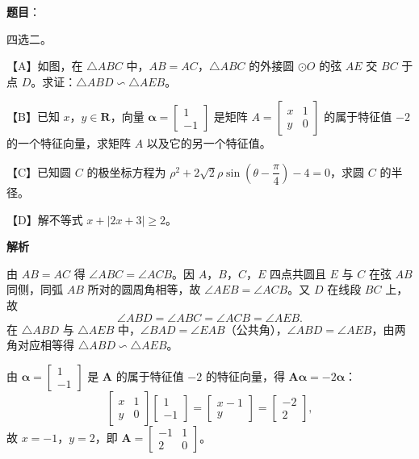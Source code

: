 \begin{answer}

\textbf{题目}：

四选二。

【A】如图，在 \(\triangle ABC\) 中，\(AB=AC\)，\(\triangle ABC\) 的外接圆 \(\odot O\) 的弦 \(AE\) 交 \(BC\) 于点 \(D\)。求证：\(\triangle ABD\backsim\triangle AEB\)。
\nopagebreak[4]
\begin{center}\end{center}
\nopagebreak[4]
【B】已知 \(x\)，\(y\in\mathbf{R}\)，向量 \(\boldsymbol\alpha=\begin{bmatrix}1\\-1\end{bmatrix}\) 是矩阵 $A=\begin{bmatrix}x&1\\y&0\end{bmatrix}$ 的属于特征值 \(-2\) 的一个特征向量，求矩阵 \(A\) 以及它的另一个特征值。

【C】已知圆 \(C\) 的极坐标方程为 \(\rho^{2}+2\sqrt{2}\rho\sin\left(\theta-\dfrac{\pi}{4}\right)-4=0\)，求圆 \(C\) 的半径。

【D】解不等式 \(x+|2x+3|\geqslant 2\)。

\textbf{解析}


由 \(AB=AC\) 得 \(\angle ABC=\angle ACB\)。因 \(A\)，\(B\)，\(C\)，\(E\) 四点共圆且 \(E\) 与 \(C\) 在弦 \(AB\) 同侧，同弧 \(AB\) 所对的圆周角相等，故 \(\angle AEB=\angle ACB\)。又 \(D\) 在线段 \(BC\) 上，故
\nopagebreak[4]
\[
\angle ABD=\angle ABC=\angle ACB=\angle AEB.
\]
在 \(\triangle ABD\) 与 \(\triangle AEB\) 中，\(\angle BAD=\angle EAB\)（公共角），\(\angle ABD=\angle AEB\)，由两角对应相等得 \(\triangle ABD\backsim\triangle AEB\)。


由 \(\boldsymbol\alpha=\begin{bmatrix}1\\-1\end{bmatrix}\) 是 \(\boldsymbol A\) 的属于特征值 \(-2\) 的特征向量，得 \(\boldsymbol A\boldsymbol\alpha=-2\boldsymbol\alpha\)：
\nopagebreak[4]
\[
\begin{bmatrix}x&1\\y&0\end{bmatrix}\begin{bmatrix}1\\-1\end{bmatrix}=\begin{bmatrix}x-1\\y\end{bmatrix}=\begin{bmatrix}-2\\2\end{bmatrix},
\]
故 \(x=-1\)，\(y=2\)，即 $\boldsymbol A=\begin{bmatrix}-1&1\\2&0\end{bmatrix}$。


\end{answer}
